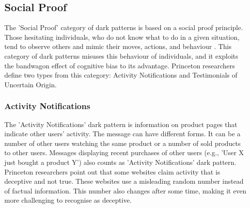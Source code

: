     \subsection{Social Proof}
    The 'Social Proof' category of dark patterns is based on a social proof principle. Those hesitating individuals, who do not know what to do in a given situation, tend to observe others and mimic their moves, actions, and behaviour \cite{influence-cialdini, evilbydesign}. This category of dark patterns misuses this behaviour of individuals, and it exploits the bandwagon effect of cognitive bias to its advantage. Princeton researchers define two types from this category: Activity Notifications and Testimonials of Uncertain Origin.

        \subsubsection{Activity Notifications}
        The 'Activity Notifications' dark pattern is information on product pages that indicate other users' activity. The message can have different forms. It can be a number of other users watching the same product or a number of sold products to other users. Messages displaying recent purchases of other users (e.g., 'User X just bought a product Y') also counts as 'Activity Notifications' dark pattern. Princeton researchers point out that some websites claim activity that is deceptive and not true. These websites use a misleading random number instead of factual information. This number also changes after some time, making it even more challenging to recognise as deceptive. 

